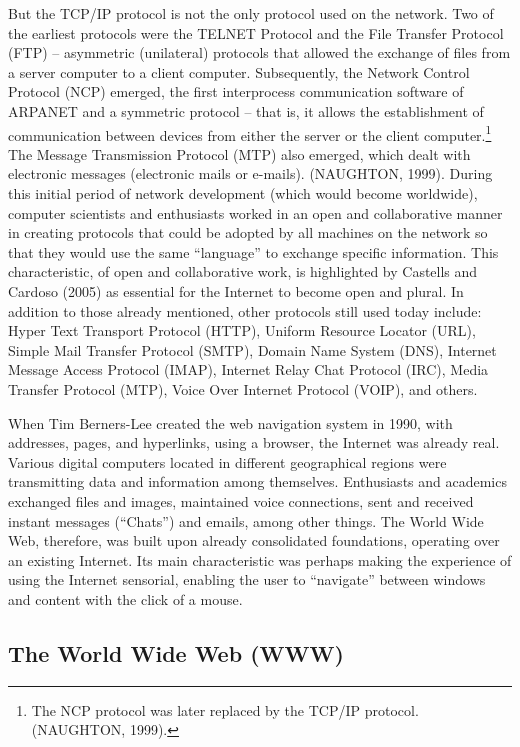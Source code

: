 But the TCP/IP protocol is not the only protocol used on the network. Two of the earliest protocols were the TELNET Protocol and the File Transfer Protocol (FTP) -- asymmetric (unilateral) protocols that allowed the exchange of files from a server computer to a client computer. Subsequently, the Network Control Protocol (NCP) emerged, the first interprocess communication software of ARPANET and a symmetric protocol -- that is, it allows the establishment of communication between devices from either the server or the client computer.\footnote{The NCP protocol was later replaced by the TCP/IP protocol. (NAUGHTON, 1999).} The Message Transmission Protocol (MTP) also emerged, which dealt with electronic messages (electronic mails or e-mails). (NAUGHTON, 1999). During this initial period of network development (which would become worldwide), computer scientists and enthusiasts worked in an open and collaborative manner in creating protocols that could be adopted by all machines on the network so that they would use the same ``language'' to exchange specific information. This characteristic, of open and collaborative work, is highlighted by Castells and Cardoso (2005) as essential for the Internet to become open and plural. In addition to those already mentioned, other protocols still used today include: Hyper Text Transport Protocol (HTTP), Uniform Resource Locator (URL), Simple Mail Transfer Protocol (SMTP), Domain Name System (DNS), Internet Message Access Protocol (IMAP), Internet Relay Chat Protocol (IRC), Media Transfer Protocol (MTP), Voice Over Internet Protocol (VOIP), and others.

When Tim Berners-Lee created the web navigation system in 1990, with addresses, pages, and hyperlinks, using a browser, the Internet was already real. Various digital computers located in different geographical regions were transmitting data and information among themselves. Enthusiasts and academics exchanged files and images, maintained voice connections, sent and received instant messages (``Chats'') and emails, among other things. The World Wide Web, therefore, was built upon already consolidated foundations, operating over an existing Internet. Its main characteristic was perhaps making the experience of using the Internet sensorial, enabling the user to ``navigate'' between windows and content with the click of a mouse.


\subsection{The World Wide Web (WWW)}

